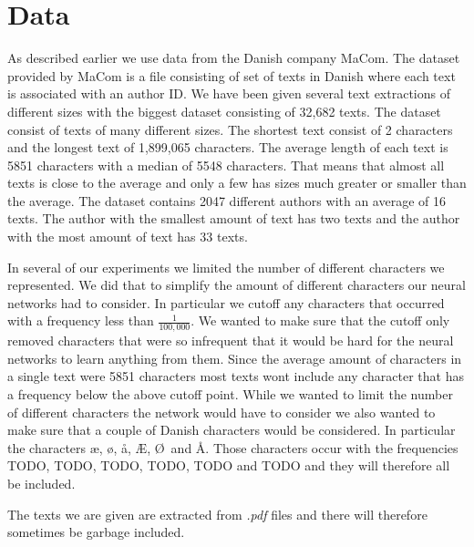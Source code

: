 \section{Data} \label{sec:data}

As described earlier we use data from the Danish company MaCom. The dataset
provided by MaCom is a file consisting of set of texts in Danish where each text
is associated with an author ID. We have been given several text extractions
of different sizes with the biggest dataset consisting of 32,682 texts. The
dataset consist of texts of many different sizes. The shortest text consist of 2
characters and the longest text of 1,899,065 characters. The average length of
each text is 5851 characters with a median of 5548 characters. That means that
almost all texts is close to the average and only a few has sizes much greater
or smaller than the average. The dataset contains 2047 different authors with
an average of 16 texts. The author with the smallest amount of text has two
texts and the author with the most amount of text has 33 texts.

In several of our experiments we limited the number of different characters we
represented. We did that to simplify the amount of different characters our
neural networks had to consider. In particular we cutoff any characters that
occurred with a frequency less than $\frac{1}{100,000}$. We wanted to make sure
that the cutoff only removed characters that were so infrequent that it would be
hard for the neural networks to learn anything from them. Since the average
amount of characters in a single text were 5851 characters most texts wont
include any character that has a frequency below the above cutoff point. While
we wanted to limit the number of different characters the network would have to
consider we also wanted to make sure that a couple of Danish characters would be
considered. In particular the characters \ae, \o, \aa, \AE, \O\ and \AA. Those
characters occur with the frequencies TODO, TODO, TODO, TODO, TODO and TODO and
they will therefore all be included.

The texts we are given are extracted from \textit{.pdf} files and there will
therefore sometimes be garbage included.
